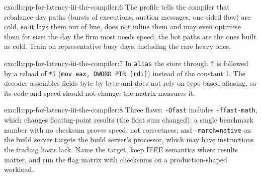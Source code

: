 \begin{solution}{exo:ll:cpp-for-latency-iii-the-compiler:6}
The profile tells the compiler that rebalance-day paths (bursts of executions, auction messages, one-sided flow) are cold,
so it lays them out of line, does not inline them and may even optimise them for size: the day the firm most needs speed,
the hot paths are the ones built as cold. Train on representative busy days, including the rare heavy ones.
\end{solution}

\begin{solution}{exo:ll:cpp-for-latency-iii-the-compiler:7}
In \texttt{alias} the store through \texttt{f} is followed by a reload of \texttt{*i}
(\texttt{mov eax, DWORD PTR [rdi]}) instead of the constant 1. The decoder assembles fields byte by byte and does not rely
on type-based aliasing, so its code and speed should not change; the matrix measures it.
\end{solution}

\begin{solution}{exo:ll:cpp-for-latency-iii-the-compiler:8}
Three flaws: \texttt{-Ofast} includes \texttt{-ffast-math}, which changes floating-point results (the float sum changed); a
single benchmark number with no checksum proves speed, not correctness; and \texttt{-march=native} on the build server
targets the build server's processor, which may have instructions the trading hosts lack. Name the target, keep IEEE
semantics where results matter, and run the flag matrix with checksums on a production-shaped workload.
\end{solution}


